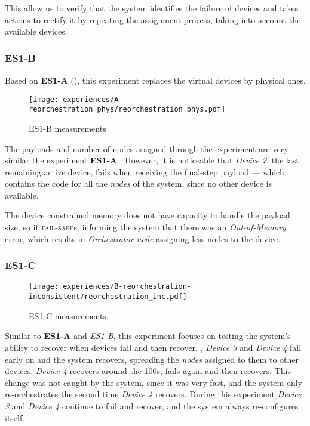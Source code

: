 This allow us to verify that the system identifies the failure of devices and takes actions to rectify it by repeating the assignment process, taking into account the available devices.


\subsubsection{ES1-B}

Based on \textbf{ES1-A} (\cf {}), this experiment replaces the virtual devices by physical ones. 

\begin{figure}[h]
    \centering
    \texttt{[image: experiences/A-reorchestration\_phys/reorchestration\_phys.pdf]}
    \caption{ES1-B measurements}
    \label{fig:experiment_a_phys_graph}
\end{figure}

The payloads and number of nodes assigned through the experiment are very similar the experiment \textbf{ES1-A} . However, it is noticeable that \textit{Device 2}, the last remaining active device, fails when receiving the final-step payload --- which contains the code for all the \textit{nodes} of the system, since no other device is available. 

The device constrained memory does not have capacity to handle the payload size, so it \textsc{fail-safe}s, informing the system that there was an \textit{Out-of-Memory} error, which results in \textit{Orchestrator node} assigning less nodes to the device.


\subsubsection{ES1-C}

\begin{figure}[h]
    \centering
    \texttt{[image: experiences/B-reorchestration-inconsistent/reorchestration\_inc.pdf]}
    \caption[ES1-C measurements]{ES1-C measurements.}
    \label{fig:experiment_b_graph}
\end{figure}

Similar to \textbf{ES1-A} and \textit{ES1-B}, this experiment focuses on testing the system's ability to recover when devices fail and then recover. , \textit{Device 3} and \textit{Device 4} fail early on and the system recovers, spreading the \textit{nodes} assigned to them to other devices. \textit{Device 4} recovers around the 100s, fails again and then recovers. This change was not caught by the system, since it was very fast, and the system only re-orchestrates the second time \textit{Device 4} recovers. During this experiment \textit{Device 3} and \textit{Device 4} continue to fail and recover, and the system always re-configures itself.

